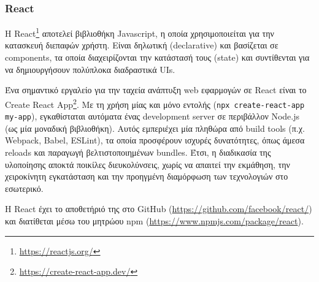 \subsubsection{React} \label{subsection:4-2-2-1-react}


Η React\footnote{\url{https://reactjs.org/}} αποτελεί βιβλιοθήκη Javascript, η οποία χρησιμοποιείται για την κατασκευή διεπαφών χρήστη. Είναι δηλωτική (declarative) και βασίζεται σε components, τα οποία διαχειρίζονται την κατάστασή τους (state) και συντίθενται για να δημιουργήσουν πολύπλοκα διαδραστικά UIs.


Ένα σημαντικό εργαλείο για την ταχεία ανάπτυξη web εφαρμογών σε React είναι το Create React App\footnote{\url{https://create-react-app.dev/}}. Με τη χρήση μίας και μόνο εντολής (\texttt{npx create-react-app my-app}), εγκαθίσταται αυτόματα ένας development server σε περιβάλλον Node.js (ως μία μοναδική βιβλιοθήκη). Αυτός εμπεριέχει μία πληθώρα από build tools (π.χ. Webpack, Babel, ESLint), τα οποία προσφέρουν ισχυρές δυνατότητες, όπως άμεσα reloads και παραγωγή βελτιστοποιημένων bundles. Έτσι, η διαδικασία της υλοποίησης αποκτά ποικίλες διευκολύνσεις, χωρίς να απαιτεί την εκμάθηση, την χειροκίνητη εγκατάσταση και την προηγμένη διαμόρφωση των τεχνολογιών στο εσωτερικό. 

Η React έχει το αποθετήριό της στο GitHub (\url{https://github.com/facebook/react/}) και διατίθεται μέσω του μητρώου npm (\url{https://www.npmjs.com/package/react}).
